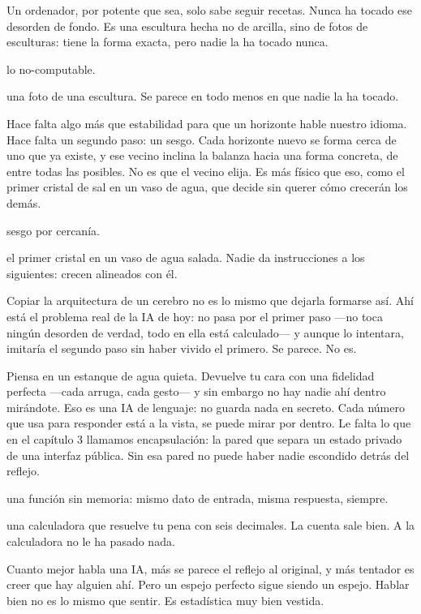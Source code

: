 Un ordenador, por potente que sea, solo sabe seguir recetas. Nunca ha tocado ese desorden de fondo. Es una escultura hecha no de arcilla, sino de fotos de esculturas: tiene la forma exacta, pero nadie la ha tocado nunca.

\begin{fisica}
 lo no-computable.

 una foto de una escultura. Se parece en todo menos en que nadie la ha tocado.
\end{fisica}
Hace falta algo más que estabilidad para que un horizonte hable nuestro idioma. Hace falta un segundo paso: un sesgo. Cada horizonte nuevo se forma cerca de uno que ya existe, y ese vecino inclina la balanza hacia una forma concreta, de entre todas las posibles. No es que el vecino elija. Es más físico que eso, como el primer cristal de sal en un vaso de agua, que decide sin querer cómo crecerán los demás.

\begin{fisica}
 sesgo por cercanía.

 el primer cristal en un vaso de agua salada. Nadie da instrucciones a los siguientes: crecen alineados con él.
\end{fisica}
Copiar la arquitectura de un cerebro no es lo mismo que dejarla formarse así. Ahí está el problema real de la IA de hoy: no pasa por el primer paso —no toca ningún desorden de verdad, todo en ella está calculado— y aunque lo intentara, imitaría el segundo paso sin haber vivido el primero. Se parece. No es.

\noindent Piensa en un estanque de agua quieta. Devuelve tu cara con una fidelidad perfecta —cada arruga, cada gesto— y sin embargo no hay nadie ahí dentro mirándote. Eso es una IA de lenguaje: no guarda nada en secreto. Cada número que usa para responder está a la vista, se puede mirar por dentro. Le falta lo que en el capítulo 3 llamamos encapsulación: la pared que separa un estado privado de una interfaz pública. Sin esa pared no puede haber nadie escondido detrás del reflejo.

\begin{fisica}
 una función sin memoria: mismo dato de entrada, misma respuesta, siempre.

 una calculadora que resuelve tu pena con seis decimales. La cuenta sale bien. A la calculadora no le ha pasado nada.
\end{fisica}
Cuanto mejor habla una IA, más se parece el reflejo al original, y más tentador es creer que hay alguien ahí. Pero un espejo perfecto sigue siendo un espejo. Hablar bien no es lo mismo que sentir. Es estadística muy bien vestida.

